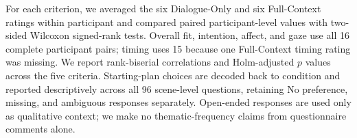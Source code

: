 For each criterion, we averaged the six Dialogue-Only and six Full-Context ratings within participant and compared paired participant-level values with two-sided Wilcoxon signed-rank tests. Overall fit, intention, affect, and gaze use all 16 complete participant pairs; timing uses 15 because one Full-Context timing rating was missing. We report rank-biserial correlations and Holm-adjusted $p$ values across the five criteria. Starting-plan choices are decoded back to condition and reported descriptively across all 96 scene-level questions, retaining No preference, missing, and ambiguous responses separately. Open-ended responses are used only as qualitative context; we make no thematic-frequency claims from questionnaire comments alone.
